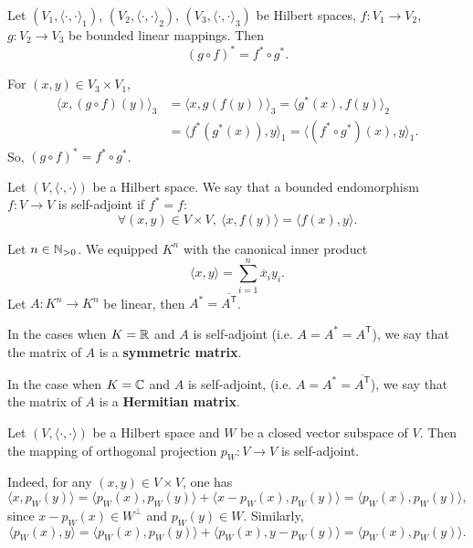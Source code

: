 \begin{propositionenv}
    Let $(V_1,\langle\cdot,\cdot\rangle_{1})$, $(V_2,\langle\cdot,\cdot\rangle_{2})$, $(V_3,\langle\cdot,\cdot\rangle_{3})$ be Hilbert spaces,
    $f: V_1\rightarrow V_2$, $g:V_2\rightarrow V_3$ be bounded linear mappings. 
    Then 
    $$ (g\circ f)^* = f^*\circ g^*.$$
\end{propositionenv}
\begin{proofenv}
    For $(x,y) \in V_3\times V_1$,
    $$\begin{aligned}
        \langle x, (g\circ f)(y)\rangle_{3} &= \langle x,g(f(y))\rangle_{3} = \langle g^*(x), f(y)\rangle_{2}\\
        &= \langle f^*(g^*(x)), y\rangle_{1} = \langle (f^*\circ g^*)(x), y\rangle_{1}.
    \end{aligned}$$
    So, $\left(g\circ f\right)^* = f^*\circ g^*$.
\end{proofenv}

\begin{definitionenv}
    Let $\left(V,\langle\cdot,\cdot\rangle\right)$ be a Hilbert space.
    We say that a bounded endomorphism $f:V\rightarrow V$ is self-adjoint if $f^* = f$:
    $$ \forall (x,y)\in V\times V, \ \langle x,f(y)\rangle = \langle f(x),y\rangle.$$
\end{definitionenv}

\begin{definitionenv}
    Let $n\in \mathbb{N}_{>0}$.
    We equipped $K^n$ with the canonical inner product
    $$ \langle x,y\rangle = \sum_{i=1}^{n} \overline{x}_i y_i.$$
    Let $A:K^n\rightarrow K^n$ be linear, then $A^* = \overline{A^{\mathsf{T}}}$.

    \quad In the cases when $K =\mathbb{R}$ and $A$ is self-adjoint (i.e. $A = A^* = A^{\mathsf{T}}$), we say that the matrix of $A$ is a \textbf{symmetric matrix}.

    \quad In the case when $K = \mathbb{C}$ and $A$ is self-adjoint, (i.e. $A = A^* = \overline{A^{\mathsf{T}}}$), we say that the matrix of $A$ is a \textbf{Hermitian matrix}.
\end{definitionenv}

\begin{exampleenv}
    Let $(V,\langle \cdot,\cdot\rangle)$ be a Hilbert space and $W$ be a closed vector subspace of $V$.
    Then the mapping of orthogonal projection $p_W:V\rightarrow V$ is self-adjoint.
    
    \quad Indeed, for any $(x,y)\in V\times V$, one has
    $$ \langle x, p_W(y)\rangle = \langle p_W(x), p_W(y)\rangle + \langle x - p_W(x), p_W(y)\rangle = \langle p_W(x), p_W(y)\rangle,$$
    since $x - p_W(x) \in W^\perp$ and $p_W(y)\in W$.
    Similarly, 
    $$ \langle p_W(x), y\rangle = \langle p_W(x), p_W(y)\rangle + \langle p_W(x), y - p_W(y)\rangle = \langle p_W(x), p_W(y)\rangle.$$
\end{exampleenv}



